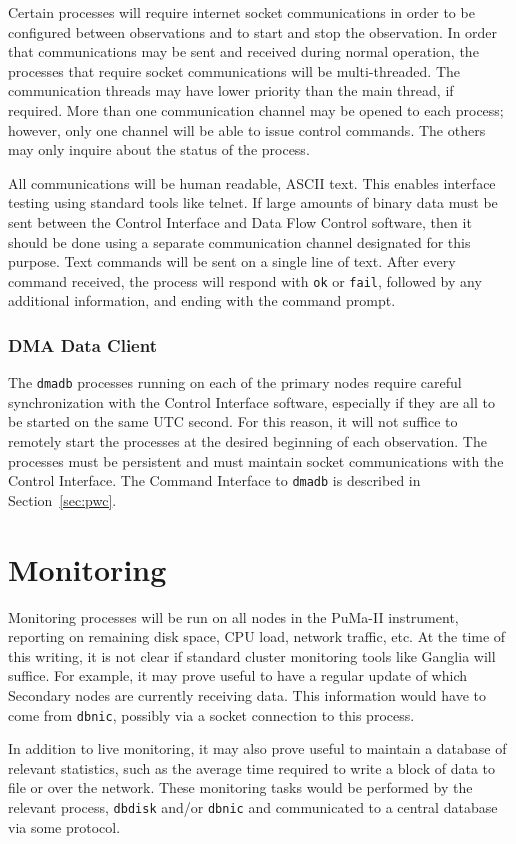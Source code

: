 Certain processes will require internet socket communications in order
to be configured between observations and to start and stop the
observation.  In order that communications may be sent and received
during normal operation, the processes that require socket
communications will be multi-threaded.  The communication threads may
have lower priority than the main thread, if required.  More than one
communication channel may be opened to each process; however, only one
channel will be able to issue control commands.  The others may only
inquire about the status of the process.

All communications will be human readable, ASCII text.  This enables
interface testing using standard tools like telnet.  If large amounts
of binary data must be sent between the Control Interface and Data
Flow Control software, then it should be done using a separate
communication channel designated for this purpose.  Text commands will
be sent on a single line of text.  After every command received, the
process will respond with {\tt ok} or {\tt fail}, followed by any
additional information, and ending with the command prompt.

\subsubsection{DMA Data Client}

The {\tt dmadb} processes running on each of the primary nodes
require careful synchronization with the Control Interface software,
especially if they are all to be started on the same UTC second.  For
this reason, it will not suffice to remotely start the processes at
the desired beginning of each observation.  The processes must be
persistent and must maintain socket communications with the Control
Interface.  The Command Interface to {\tt dmadb} is described in
Section~\ref{sec:pwc}.

\section{Monitoring}

Monitoring processes will be run on all nodes in the PuMa-II
instrument, reporting on remaining disk space, CPU load, network
traffic, etc.  At the time of this writing, it is not clear if
standard cluster monitoring tools like Ganglia will suffice.  For
example, it may prove useful to have a regular update of which
Secondary nodes are currently receiving data.  This information would
have to come from {\tt dbnic}, possibly via a socket connection to
this process.

In addition to live monitoring, it may also prove useful to maintain a
database of relevant statistics, such as the average time required to
write a block of data to file or over the network.  These monitoring
tasks would be performed by the relevant process, {\tt dbdisk} and/or
{\tt dbnic} and communicated to a central database via some protocol.
